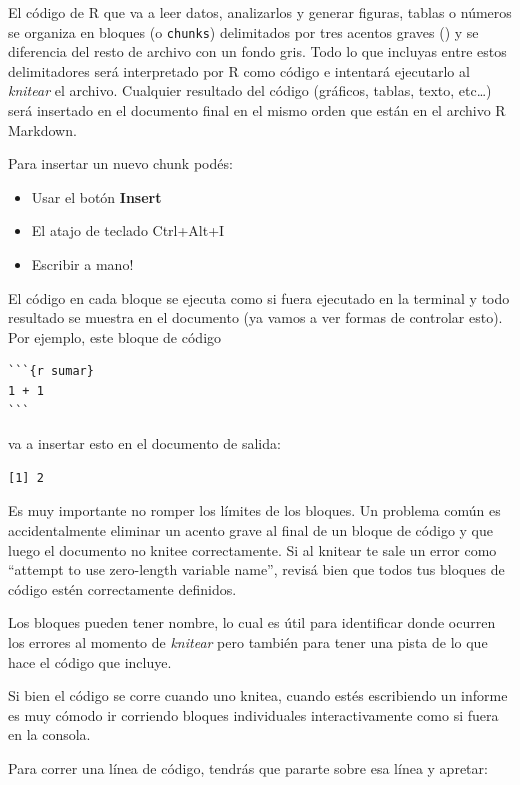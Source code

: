 \documentclass[
  openany]{book}
\providecommand{\tightlist}{%
  \setlength{\itemsep}{0pt}\setlength{\parskip}{0pt}}
\begin{document}
El código de R que va a leer datos, analizarlos y generar figuras, tablas o números se organiza en bloques (o \texttt{chunks}) delimitados por tres acentos graves (\texttt{\textasciigrave{}\textasciigrave{}\textasciigrave{}}) y se diferencia del resto de archivo con un fondo gris.
Todo lo que incluyas entre estos delimitadores será interpretado por R como código e intentará ejecutarlo al \emph{knitear} el archivo.
Cualquier resultado del código (gráficos, tablas, texto, etc\ldots) será insertado en el documento final en el mismo orden que están en el archivo R Markdown.

Para insertar un nuevo chunk podés:

\begin{itemize}
\tightlist
\item
  Usar el botón \textbf{Insert}
\item
  El atajo de teclado Ctrl+Alt+I
\item
  Escribir a mano!
\end{itemize}

El código en cada bloque se ejecuta como si fuera ejecutado en la terminal y todo resultado se muestra en el documento (ya vamos a ver formas de controlar esto).
Por ejemplo, este bloque de código

\begin{verbatim}
```{r sumar}
1 + 1
```
\end{verbatim}

va a insertar esto en el documento de salida:

\begin{verbatim}
[1] 2
\end{verbatim}

Es muy importante no romper los límites de los bloques.
Un problema común es accidentalmente eliminar un acento grave al final de un bloque de código y que luego el documento no knitee correctamente.
Si al knitear te sale un error como ``attempt to use zero-length variable name'', revisá bien que todos tus bloques de código estén correctamente definidos.

Los bloques pueden tener nombre, lo cual es útil para identificar donde ocurren los errores al momento de \emph{knitear} pero también para tener una pista de lo que hace el código que incluye.

Si bien el código se corre cuando uno knitea, cuando estés escribiendo un informe es muy cómodo ir corriendo bloques individuales interactivamente como si fuera en la consola.

Para correr una línea de código, tendrás que pararte sobre esa línea y apretar:
\end{document}
